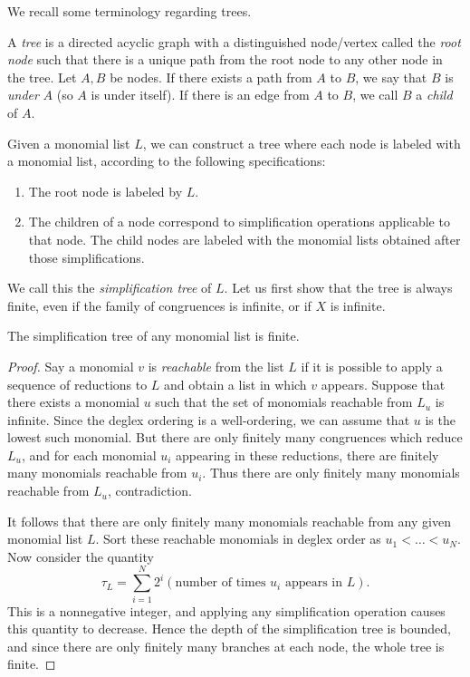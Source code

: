 We recall some terminology regarding trees.
\begin{defn}
	A \emph{tree} is a directed acyclic graph with a distinguished node/vertex called the \emph{root node} such that there is a unique path from the root node to any other node in the tree. Let $A,B$ be nodes. If there exists a path from $A$ to $B$, we say that $B$ is \emph{under} $A$ (so $A$ is under itself). If there is an edge from $A$ to $B$, we call $B$ a \emph{child} of $A$.
\end{defn}
Given a monomial list $L$, we can construct a tree where each node is labeled with a monomial list, according to the following specifications:
\begin{enumerate}
	\item The root node is labeled by $L$.
	\item The children of a node correspond to simplification operations applicable to that node. The child nodes are labeled with the monomial lists obtained after those simplifications.
\end{enumerate}
We call this the \emph{simplification tree} of $L$. Let us first show that the tree is always finite, even if the family of congruences is infinite, or if $X$ is infinite.
\begin{prop}\label{prop:finite-tree}
	The simplification tree of any monomial list is finite.
\end{prop}
\begin{proof}
	Say a monomial $v$ is \emph{reachable} from the list $L$ if it is possible to apply a sequence of reductions to $L$ and obtain a list in which $v$ appears. Suppose that there exists a monomial $u$ such that the set of monomials reachable from $L_u$ is infinite. Since the deglex ordering is a well-ordering, we can assume that $u$ is the lowest such monomial. But there are only finitely many congruences which reduce $L_u$, and for each monomial $u_i$ appearing in these reductions, there are finitely many monomials reachable from $u_i$. Thus there are only finitely many monomials reachable from $L_u$, contradiction.
	
	It follows that there are only finitely many monomials reachable from any given monomial list $L$. Sort these reachable monomials in deglex order as $u_1 < \ldots < u_N$. Now consider the quantity
	\[
		\tau_L = \sum_{i=1}^N 2^i (\text{number of times }u_i \text{ appears in }L).
	\]
	This is a nonnegative integer, and applying any simplification operation causes this quantity to decrease. Hence the depth of the simplification tree is bounded, and since there are only finitely many branches at each node, the whole tree is finite.
\end{proof}

